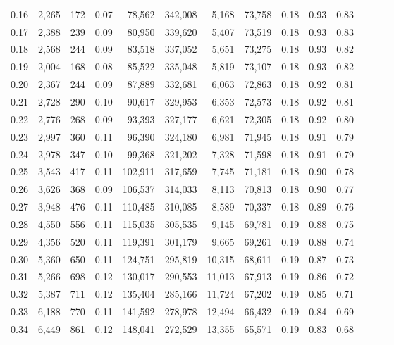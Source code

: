 \begin{tabular}{rrrrrrrrrrrrrr}
0.16 &  2,265 &    172 &  0.07 &   78,562 &  342,008 &   5,168 &  73,758 &  0.18 &  0.93 &      0.83 \\
0.17 &  2,388 &    239 &  0.09 &   80,950 &  339,620 &   5,407 &  73,519 &  0.18 &  0.93 &      0.83 \\
0.18 &  2,568 &    244 &  0.09 &   83,518 &  337,052 &   5,651 &  73,275 &  0.18 &  0.93 &      0.82 \\
0.19 &  2,004 &    168 &  0.08 &   85,522 &  335,048 &   5,819 &  73,107 &  0.18 &  0.93 &      0.82 \\
0.20 &  2,367 &    244 &  0.09 &   87,889 &  332,681 &   6,063 &  72,863 &  0.18 &  0.92 &      0.81 \\
0.21 &  2,728 &    290 &  0.10 &   90,617 &  329,953 &   6,353 &  72,573 &  0.18 &  0.92 &      0.81 \\
0.22 &  2,776 &    268 &  0.09 &   93,393 &  327,177 &   6,621 &  72,305 &  0.18 &  0.92 &      0.80 \\
0.23 &  2,997 &    360 &  0.11 &   96,390 &  324,180 &   6,981 &  71,945 &  0.18 &  0.91 &      0.79 \\
0.24 &  2,978 &    347 &  0.10 &   99,368 &  321,202 &   7,328 &  71,598 &  0.18 &  0.91 &      0.79 \\
0.25 &  3,543 &    417 &  0.11 &  102,911 &  317,659 &   7,745 &  71,181 &  0.18 &  0.90 &      0.78 \\
0.26 &  3,626 &    368 &  0.09 &  106,537 &  314,033 &   8,113 &  70,813 &  0.18 &  0.90 &      0.77 \\
0.27 &  3,948 &    476 &  0.11 &  110,485 &  310,085 &   8,589 &  70,337 &  0.18 &  0.89 &      0.76 \\
0.28 &  4,550 &    556 &  0.11 &  115,035 &  305,535 &   9,145 &  69,781 &  0.19 &  0.88 &      0.75 \\
0.29 &  4,356 &    520 &  0.11 &  119,391 &  301,179 &   9,665 &  69,261 &  0.19 &  0.88 &      0.74 \\
0.30 &  5,360 &    650 &  0.11 &  124,751 &  295,819 &  10,315 &  68,611 &  0.19 &  0.87 &      0.73 \\
0.31 &  5,266 &    698 &  0.12 &  130,017 &  290,553 &  11,013 &  67,913 &  0.19 &  0.86 &      0.72 \\
0.32 &  5,387 &    711 &  0.12 &  135,404 &  285,166 &  11,724 &  67,202 &  0.19 &  0.85 &      0.71 \\
0.33 &  6,188 &    770 &  0.11 &  141,592 &  278,978 &  12,494 &  66,432 &  0.19 &  0.84 &      0.69 \\
0.34 &  6,449 &    861 &  0.12 &  148,041 &  272,529 &  13,355 &  65,571 &  0.19 &  0.83 &      0.68 \\

\end{tabular}
